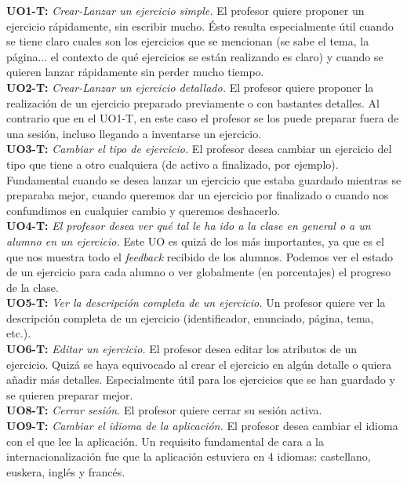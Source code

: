 \textbf{UO1-T:} \textit{Crear-Lanzar un ejercicio simple.} El profesor quiere proponer un ejercicio rápidamente, sin escribir mucho. Ésto resulta especialmente útil cuando se tiene claro cuales son los ejercicios que se mencionan (se sabe el tema, la página... el contexto de qué ejercicios se están realizando es claro) y cuando se quieren lanzar rápidamente sin perder mucho tiempo.\\

\textbf{UO2-T:} \textit{Crear-Lanzar un ejercicio detallado.} El profesor quiere proponer la realización de un ejercicio preparado previamente o con bastantes detalles. Al contrario que en el UO1-T, en este caso el profesor se los puede preparar fuera de una sesión, incluso llegando a inventarse un ejercicio.\\

\textbf{UO3-T:} \textit{Cambiar el tipo de ejercicio.} El profesor desea cambiar un ejercicio del tipo que tiene a otro cualquiera (de activo a finalizado, por ejemplo). Fundamental cuando se desea lanzar un ejercicio que estaba guardado mientras se preparaba mejor, cuando queremos dar un ejercicio por finalizado o cuando nos confundimos en cualquier cambio y queremos deshacerlo.\\

\textbf{UO4-T:} \textit{El profesor desea ver qué tal le ha ido a la clase en general o a un alumno en un ejercicio.} Este UO es quizá de los más importantes, ya que es el que nos muestra todo el \textit{feedback} recibido de los alumnos. Podemos ver el estado de un ejercicio para cada alumno o ver globalmente (en porcentajes) el progreso de la clase.\\

\textbf{UO5-T:} \textit{Ver la descripción completa de un ejercicio.} Un profesor quiere ver la descripción completa de un ejercicio (identificador, enunciado, página, tema, etc.).\\

\textbf{UO6-T:} \textit{Editar un ejercicio.} El profesor desea editar los atributos de un ejercicio. Quizá se haya equivocado al crear el ejercicio en algún detalle o quiera añadir más detalles. Especialmente útil para los ejercicios que se han guardado y se quieren preparar mejor.\\

\textbf{UO8-T:} \textit{Cerrar sesión.} El profesor quiere cerrar su sesión activa.\\

\textbf{UO9-T:} \textit{Cambiar el idioma de la aplicación.} El profesor desea cambiar el idioma con el que lee la aplicación. Un requisito fundamental de cara a la internacionalización fue que la aplicación estuviera en 4 idiomas: castellano, euskera, inglés y francés.\\

